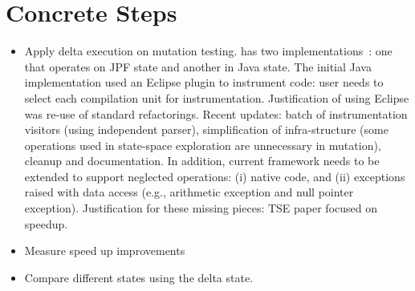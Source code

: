 \documentclass[10pt]{article}
\begin{document}
\section{Concrete Steps}
\begin{itemize}
\item Apply delta execution on mutation testing.  \DEA{} has two
  implementations~\cite{damorim-tse-2008}: one that operates on JPF
  state and another in Java state.  The initial Java implementation
  used an Eclipse plugin to instrument code: user needs to select each
  compilation unit for instrumentation.  Justification of using
  Eclipse was re-use of standard refactorings.  Recent updates: batch
  of instrumentation visitors (using independent parser),
  simplification of infra-structure (some operations used in
  state-space exploration are unnecessary in mutation), cleanup and
  documentation.  In addition, current framework needs to be extended
  to support neglected operations: (i) native code, and (ii)
  exceptions raised with data access (e.g., arithmetic exception and
  null pointer exception).  Justification for these missing pieces:
  TSE paper focused on speedup.

\item Measure speed up improvements
\item Compare different states using the delta state.
\end{itemize}



\end{document}

